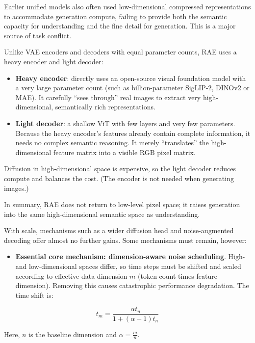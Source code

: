 Earlier unified models also often used low-dimensional compressed representations to accommodate generation compute, failing to provide both the semantic capacity for understanding and the fine detail for generation. This is a major source of task conflict.

Unlike VAE encoders and decoders with equal parameter counts, RAE uses a heavy encoder and light decoder:

\begin{itemize}
\tightlist
\item
  \textbf{Heavy encoder}: directly uses an open-source visual foundation model with a very large parameter count (such as billion-parameter SigLIP-2, DINOv2 or MAE). It carefully ``sees through'' real images to extract very high-dimensional, semantically rich representations.
\item
  \textbf{Light decoder}: a shallow ViT with few layers and very few parameters. Because the heavy encoder's features already contain complete information, it needs no complex semantic reasoning. It merely ``translates'' the high-dimensional feature matrix into a visible RGB pixel matrix.
\end{itemize}

Diffusion in high-dimensional space is expensive, so the light decoder reduces compute and balances the cost. (The encoder is not needed when generating images.)

In summary, RAE does not return to low-level pixel space; it raises generation into the same high-dimensional semantic space as understanding.

With scale, mechanisms such as a wider diffusion head and noise-augmented decoding offer almost no further gains. Some mechanisms must remain, however:

\begin{itemize}
\tightlist
\item
  \textbf{Essential core mechanism: dimension-aware noise scheduling}. High- and low-dimensional spaces differ, so time steps must be shifted and scaled according to effective data dimension \(m\) (token count times feature dimension). Removing this causes catastrophic performance degradation. The time shift is:
\end{itemize}

\[
t_m=\frac{\alpha t_n}{1+(\alpha-1)t_n}
\]

Here, \(n\) is the baseline dimension and \(\alpha=\frac{m}{n}\).

